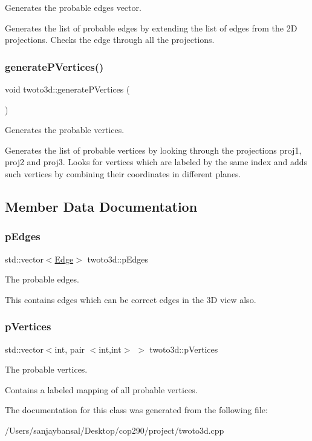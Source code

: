 Generates the probable edges vector. 

Generates the list of probable edges by extending the list of edges from the 2D projections. Checks the edge through all the projections. \mbox{\label{classtwoto3d_a7b7f3f38be16773db7b155f0be8fce6b}} 
\subsubsection{\texorpdfstring{generate\+P\+Vertices()}{generatePVertices()}}
{\footnotesize\ttfamily void twoto3d\+::generate\+P\+Vertices (\begin{DoxyParamCaption}{ }\end{DoxyParamCaption})}



Generates the probable vertices. 

Generates the list of probable vertices by looking through the projections proj1, proj2 and proj3. Looks for vertices which are labeled by the same index and adds such vertices by combining their coordinates in different planes. 

\subsection{Member Data Documentation}
\mbox{\label{classtwoto3d_a8ccf9fe8716e71f2a7d8e44760616fa1}} 
\subsubsection{\texorpdfstring{p\+Edges}{pEdges}}
{\footnotesize\ttfamily std\+::vector$<$\mbox{\hyperlink{struct_edge}{Edge}}$>$ twoto3d\+::p\+Edges}



The probable edges. 

This contains edges which can be correct edges in the 3D view also. \mbox{\label{classtwoto3d_a03217e7090aa50fa3d6fa1ac09f104e6}} 
\subsubsection{\texorpdfstring{p\+Vertices}{pVertices}}
{\footnotesize\ttfamily std\+::vector$<$int, pair $<$int,int$>$ $>$ twoto3d\+::p\+Vertices}



The probable vertices. 

Contains a labeled mapping of all probable vertices. 

The documentation for this class was generated from the following file\+:\begin{DoxyCompactItemize}
\item 
/\+Users/sanjaybansal/\+Desktop/cop290/project/twoto3d.\+cpp\end{DoxyCompactItemize}
